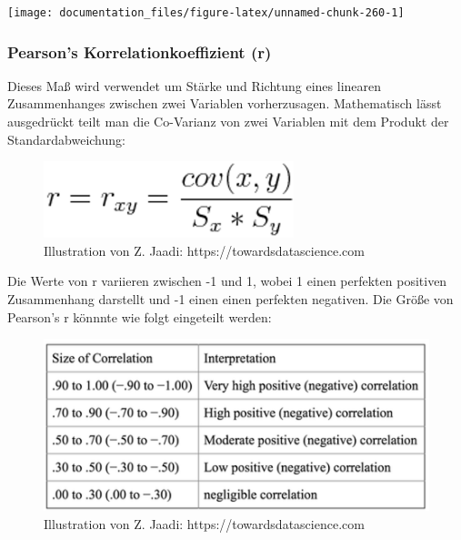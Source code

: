 \documentclass[
]{article}
\begin{document}
\begin{center}\texttt{[image: documentation\_files/figure-latex/unnamed-chunk-260-1]} \end{center}

\hypertarget{pearsons-korrelationkoeffizient-r}{%
\subsubsection{Pearson's Korrelationkoeffizient (r)}\label{pearsons-korrelationkoeffizient-r}}

Dieses Maß wird verwendet um Stärke und Richtung eines linearen Zusammenhanges zwischen zwei Variablen vorherzusagen. Mathematisch lässt ausgedrückt teilt man die Co-Varianz von zwei Variablen mit dem Produkt der Standardabweichung:

\begin{figure}

{\centering \includegraphics[width=2.86in]{images/057} 

}

\caption{Illustration von Z. Jaadi: https://towardsdatascience.com}\label{fig:unnamed-chunk-261}
\end{figure}

Die Werte von r variieren zwischen -1 und 1, wobei 1 einen perfekten positiven Zusammenhang darstellt und -1 einen einen perfekten negativen. Die Größe von Pearson's r könnnte wie folgt eingeteilt werden:

\begin{figure}

{\centering \includegraphics[width=6.47in]{images/058} 

}

\caption{Illustration von Z. Jaadi: https://towardsdatascience.com}\label{fig:unnamed-chunk-262}
\end{figure}
\end{document}
